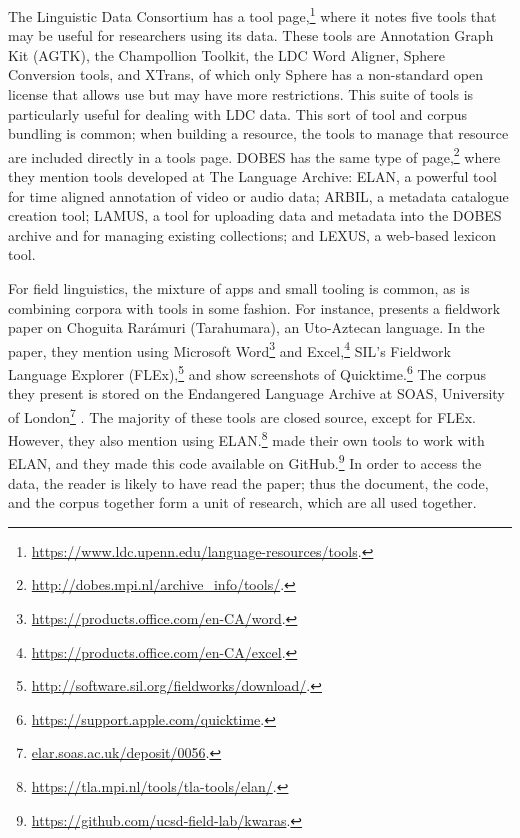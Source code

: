 The Linguistic Data Consortium has a tool page,\footnote{\href{https://www.ldc.upenn.edu/language-resources/tools}{https://www.ldc.upenn.edu/language-resources/tools}. } where it notes five tools that may be useful for researchers using its data. These tools are Annotation Graph Kit (AGTK), the Champollion Toolkit, the LDC Word Aligner, Sphere Conversion tools, and XTrans, of which only Sphere has a non-standard open license that allows use but may have more restrictions. This suite of tools is particularly useful for dealing with LDC data. This sort of tool and corpus bundling is common; when building a resource, the tools to manage that resource are included directly in a tools page. DOBES has the same type of page,\footnote{\href{http://dobes.mpi.nl/archive_info/tools/}{http://dobes.mpi.nl/archive\_info/tools/}. } where they mention tools developed at The Language Archive: ELAN, a powerful tool for time aligned annotation of video or audio data; ARBIL, a metadata catalogue creation tool; LAMUS, a tool for uploading data and metadata into the DOBES archive and for managing existing collections; and LEXUS, a web-based lexicon tool.

For field linguistics, the mixture of apps and small tooling is common, as is combining corpora with tools in some fashion. For instance, \citet{caballero2017choguita} presents a fieldwork paper on Choguita Rar\'amuri (Tarahumara), an Uto-Aztecan language. In the paper, they mention using Microsoft Word\footnote{\href{https://products.office.com/en-CA/word}{https://products.office.com/en-CA/word}. } and Excel,\footnote{\href{https://products.office.com/en-CA/excel}{https://products.office.com/en-CA/excel}. } SIL's Fieldwork Language Explorer (FLEx),\footnote{\href{http://software.sil.org/fieldworks/download/.}{http://software.sil.org/fieldworks/download/}. } and show screenshots of Quicktime.\footnote{\href{https://support.apple.com/quicktime}{https://support.apple.com/quicktime}. } The corpus they present is stored on the Endangered Language Archive at SOAS, University of London\footnote{\href{elar.soas.ac.uk/deposit/0056}{elar.soas.ac.uk/deposit/0056}. } \citep{caballero2009data}. The majority of these tools are closed source, except for FLEx. However, they also mention using ELAN.\footnote{\href{https://tla.mpi.nl/tools/tla-tools/elan/}{https://tla.mpi.nl/tools/tla-tools/elan/}. } \citet{caballero2017choguita} made their own tools to work with ELAN, and they made this code available on GitHub.\footnote{\href{https://github.com/ucsd-field-lab/kwaras}{https://github.com/ucsd-field-lab/kwaras}. } In order to access the data, the reader is likely to have read the paper; thus the document, the code, and the corpus together form a unit of research, which are all used together.

